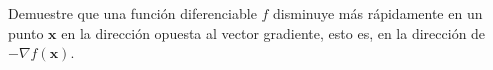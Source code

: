 \item Demuestre que una función diferenciable $f$ disminuye más rápidamente en un punto $\mathbf{x}$ en la dirección opuesta al vector gradiente, esto es, en la dirección de $-\nabla f(\mathbf{x})$.
